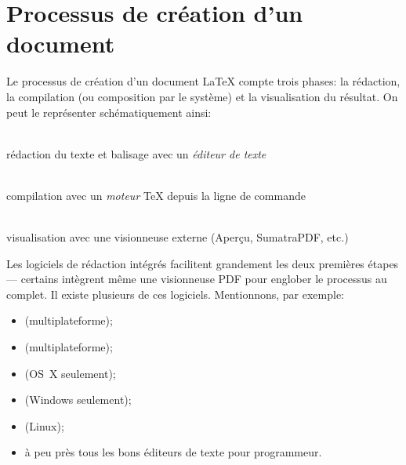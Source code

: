 \section{Processus de création d'un document}

Le processus de création d'un document {\LaTeX} compte trois phases:
la rédaction, la compilation (ou composition par le système) et la
visualisation du résultat. On peut le représenter schématiquement
ainsi:
\begin{center}
  \begin{minipage}[t]{0.25\linewidth}
    \centering
    {\Huge\faFileTextO} \\ \medskip
    rédaction du texte et balisage avec un \emph{éditeur de texte}
  \end{minipage}
  \quad{\Large\faArrowRight}\quad
  \begin{minipage}[t]{0.25\linewidth}
    \centering
    {\Huge\faCogs} \\ \medskip
    compilation avec un \emph{moteur} {\TeX} depuis la ligne de commande
  \end{minipage}
  \quad{\Large\faArrowRight}\quad
  \begin{minipage}[t]{0.25\linewidth}
    \centering
    {\Huge\faFilePdfO} \\ \medskip
    visualisation avec une visionneuse externe (Aperçu,
    SumatraPDF, etc.)
  \end{minipage}
\end{center}

Les logiciels de rédaction intégrés facilitent grandement les deux
premières étapes --- certains intègrent même une visionneuse PDF pour
englober le processus au complet. Il existe plusieurs de ces
logiciels. Mentionnons, par exemple:
\begin{itemize}
\item {}
  (multiplateforme);
\item {} (multiplateforme);
\item {} (OS~X seulement);
\item {} (Windows seulement);
\item {} (Linux);
\item à peu près tous les bons éditeurs de texte pour programmeur.
\end{itemize}

